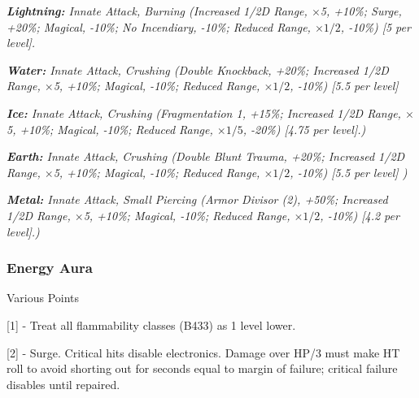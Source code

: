 \begin{multicols*}{3}
	\textcolor{OliveGreen}{\textit{\textbf{Lightning:} Innate Attack, Burning (Increased 1/2D Range, \(\times\)5, +10\%; Surge, +20\%; Magical, -10\%; No Incendiary, -10\%; Reduced Range, \(\times1/2\), -10\%) [5 per level].}}
	
	\textcolor{OliveGreen}{\textit{\textbf{Water:} Innate Attack, Crushing (Double Knockback, +20\%; Increased 1/2D Range, \(\times\)5, +10\%; Magical, -10\%; Reduced Range, \(\times1/2\), -10\%) [5.5 per level] }}
	
	\textcolor{OliveGreen}{\textit{\textbf{Ice:} Innate Attack, Crushing (Fragmentation 1, +15\%; Increased 1/2D Range, \(\times\)5, +10\%; Magical, -10\%; Reduced Range, \(\times1/5\), -20\%) [4.75 per level].)}}
	
	\textcolor{OliveGreen}{\textit{\textbf{Earth:} Innate Attack, Crushing (Double Blunt Trauma, +20\%; Increased 1/2D Range, \(\times\)5, +10\%; Magical, -10\%; Reduced Range, \(\times1/2\), -10\%) [5.5 per level] ) }}
	
	\textcolor{OliveGreen}{\textit{\textbf{Metal:} Innate Attack, Small Piercing (Armor Divisor (2), +50\%; Increased 1/2D Range, \(\times\)5, +10\%; Magical, -10\%; Reduced Range, \(\times1/2\), -10\%) [4.2 per level].) }}
	
	
	\subsubsection{Energy Aura}\label{energy_aura}
	\begin{flushright}
		Various Points
	\end{flushright}
	
	\begin{center} 
		\begin{adjustwidth}{-0mm}{}
		\end{adjustwidth}
	\end{center}
	
	[1] - Treat all flammability classes (B433) as 1 level lower.
	
	[2] - Surge. Critical hits disable electronics. Damage over HP/3 must make HT roll to avoid shorting out for seconds equal to margin of failure; critical failure disables until repaired.
	

\end{multicols*}
